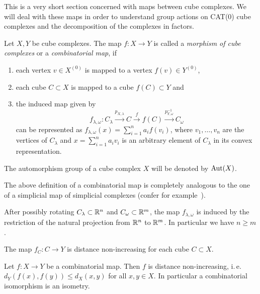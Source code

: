 This is a very short section concerned with maps between cube complexes. We will deal with these maps in order to understand group actions on CAT(0) cube complexes and the decomposition of the complexes in factors.

\begin{defin}
  \label{def:morphism-ccc}
  Let \(X,Y\) be cube complexes. The map \(f\colon X \to Y\) is called a \emph{morphism of cube complexes} or a \emph{combinatorial map}, if
  \begin{enumerate}
  \item each vertex \(v \in X^{(0)}\) is mapped to a vertex \(f(v) \in Y^{(0)}\),
  \item each cube \(C \subset X\) is mapped to a cube \(f(C) \subset Y\) and
  \item the induced map given by
    \[
      f_{\lambda, \omega}\colon C_\lambda \xrightarrow{p_{X,\lambda}} C \xrightarrow{f} f(C) \xrightarrow{p^{-1}_{Y,\omega}} C_\omega
    \]
    can be represented as \(f_{\lambda,\omega}(x) = \sum_{i=1}^n a_i f(v_i)\), where \(v_1, \dots, v_n\) are the vertices of \(C_\lambda\) and \(x = \sum_{i=1}^n a_i v_i\) is an arbitrary element of \(C_\lambda\) in its convex representation.
  \end{enumerate}
  The automorphism group of a cube complex \(X\) will be denoted by \(\operatorname{Aut}(X)\).
\end{defin}

\begin{rem}
  The above definition of a combinatorial map is completely analogous to the one of a simplicial map of simplicial complexes (confer for example~\cite{Singer}).
\end{rem}

\begin{lemma}
  After possibly rotating \(C_\lambda \subset \mathbb{R}^n\) and \(C_\omega \subset \mathbb{R}^m\), the map \(f_{\lambda, \omega}\) is induced by the restriction of the natural projection from \(\mathbb{R}^n\) to \(\mathbb{R}^m\). In particular we have \(n \geq m\).
\end{lemma}

\begin{cor}
  The map \(f_C\colon C \to Y\) is distance non-increasing for each cube \(C \subset X\).
\end{cor}

\begin{prop}
  Let \(f\colon X \to Y\) be a combinatorial map. Then \(f\) is distance non-increasing, i.\,e.\ \(d_Y(f(x), f(y)) \leq d_X(x,y)\) for all \(x,y \in X\). In particular a combinatorial isomorphism is an isometry.
\end{prop}

